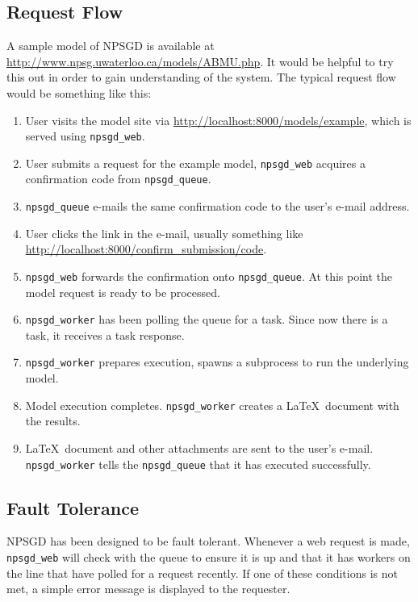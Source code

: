 \documentclass{article}
\begin{document}
\subsection{Request Flow}
A sample model of NPSGD is available at
\url{http://www.npsg.uwaterloo.ca/models/ABMU.php}. It would be helpful to try
this out in order to gain understanding of the system. The typical request flow
would be something like this:
\begin{enumerate}
    \item User visits the model site via \url{http://localhost:8000/models/example},
    which is served using \texttt{npsgd\_web}.

    \item User submits a request for the example model, \texttt{npsgd\_web}
    acquires a confirmation code from \texttt{npsgd\_queue}.

    \item \texttt{npsgd\_queue} e-mails the same confirmation code to the user's e-mail
    address.
    
    \item User clicks the link in the e-mail, usually something like
    \url{http://localhost:8000/confirm\_submission/code}. 

    \item \texttt{npsgd\_web} forwards the confirmation onto
    \texttt{npsgd\_queue}. At this point the model request is ready to be
    processed.

    \item \texttt{npsgd\_worker} has been polling the queue for a task. Since
    now there is a task, it receives a task response.

    \item \texttt{npsgd\_worker} prepares execution, spawns a subprocess to run
    the underlying model.
    
    \item Model execution completes. \texttt{npsgd\_worker} creates a \LaTeX\ 
    document with the results.

    \item \LaTeX\ document and other attachments are sent to the user's e-mail.
    \texttt{npsgd\_worker} tells the \texttt{npsgd\_queue} that it has executed successfully.
\end{enumerate}

\subsection{Fault Tolerance}
NPSGD has been designed to be fault tolerant. Whenever a web request is made,
\texttt{npsgd\_web} will check with the queue to ensure it is up and that it has
workers on the line that have polled for a request recently. If one of these
conditions is not met, a simple error message is displayed to the requester.
\end{document}
